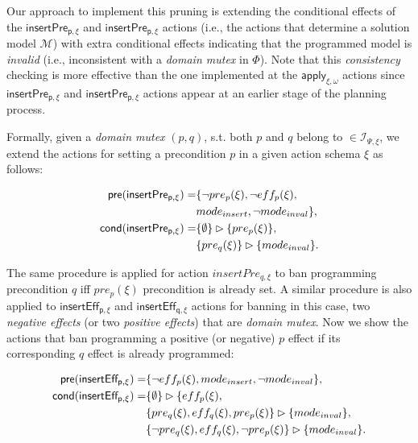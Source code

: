 \documentclass{article}
\newcommand{\pre}{\mathsf{pre}}     %
\newcommand{\cond}{\mathsf{cond}}   %
\begin{document}
Our approach to implement this pruning is extending the conditional effects of the $\mathsf{insertPre_{p,\xi}}$ and $\mathsf{insertPre_{p,\xi}}$ actions (i.e., the actions that determine a solution model $\mathcal{M}$) with extra conditional effects indicating that the programmed model is {\em invalid} (i.e., inconsistent with a {\em domain mutex} in $\Phi$). Note that this {\em consistency} checking is more effective than the one implemented at the $\mathsf{apply_{\xi,\omega}}$ actions since $\mathsf{insertPre_{p,\xi}}$ and $\mathsf{insertPre_{p,\xi}}$ actions appear at an earlier stage of the planning process.

Formally, given a {\em domain mutex} $(p,q)$, s.t. both $p$ and $q$ belong to $\in{\mathcal I}_{\Psi,\xi}$, we extend the actions for setting a precondition $p$ in a given action schema $\xi$ as follows:

\begin{small}
\begin{align*}
\hspace*{7pt}\pre(\mathsf{insertPre_{p,\xi}})=&\{\neg pre_{p}(\xi), \neg eff_{p}(\xi),\\
&mode_{insert},\neg mode_{inval}\},\\
\cond(\mathsf{insertPre_{p,\xi}})=&\{\emptyset\}\rhd\{pre_{p}(\xi)\},\\
&\{pre_{q}(\xi)\}\rhd\{mode_{inval}\}.
\end{align*}
\end{small}
The same procedure is applied for action $insertPre_{q,\xi}$ to ban programming precondition $q$ iff $pre_{p}(\xi)$ precondition is already set. A similar procedure is also applied to $\mathsf{insertEff_{p,\xi}}$ and $\mathsf{insertEff_{q,\xi}}$ actions for banning in this case, two {\em negative effects} (or two {\em positive effects}) that are {\em domain mutex}. Now we show the actions that ban programming a positive (or negative) $p$ effect if its corresponding $q$ effect is already programmed:

\begin{small}
\begin{align*}
\hspace*{7pt}\pre(\mathsf{insertEff_{p,\xi}})=&\{\neg eff_{p}(\xi), mode_{insert},\neg mode_{inval}\},\\
\cond(\mathsf{insertEff_{p,\xi}})=&\{\emptyset\}\rhd\{eff_{p}(\xi),\\
&\{pre_{q}(\xi),eff_{q}(\xi),pre_{p}(\xi)\}\rhd\{mode_{inval}\},\\
&\{\neg pre_{q}(\xi),eff_{q}(\xi),\neg pre_{p}(\xi)\}\rhd\{mode_{inval}\}.
\end{align*}
\end{small}
\end{document}

